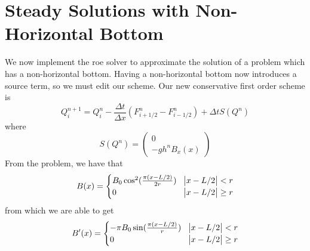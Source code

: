 \section{Steady Solutions with Non-Horizontal Bottom}
We now implement the roe solver to approximate the solution of a problem which has a non-horizontal bottom. Having a non-horizontal bottom now introduces a source term, so we must edit our scheme. Our new conservative first order scheme is 
$$Q_i^{n+1} = Q_i^n - \frac{\Delta t}{\Delta x}(F^n_{i+1/2}-F^n_{i-1/2})+\Delta t S(Q^n)$$ 
where 
$$S(Q^n)= \begin{pmatrix}
0 \\ -gh^n B_x(x)
\end{pmatrix}$$
From the problem, we have that
\[ B(x) = \begin{cases} 
      B_0 \cos^2(\frac{\pi(x-L/2)}{2r}) & \abs{x-L/2} < r \\
      0 & \abs{x-L/2} \geq r \\
   \end{cases}
\]
from which we are able to get 
\[ B'(x) = \begin{cases} 
      -\pi B_0 \sin(\frac{\pi(x-L/2)}{r}) & \abs{x-L/2} < r \\
      0 & \abs{x-L/2} \geq r \\
   \end{cases}
\]